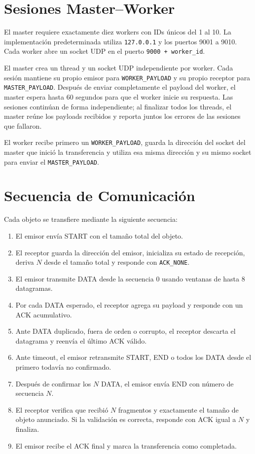 \documentclass[12pt]{article}
\begin{document}
\section{Sesiones Master--Worker}

El master requiere exactamente diez workers con IDs únicos del 1 al 10. La
implementación predeterminada utiliza \texttt{127.0.0.1} y los puertos 9001 a
9010. Cada worker abre un socket UDP en el puerto \texttt{9000 + worker\_id}.

El master crea un thread y un socket UDP independiente por worker. Cada sesión
mantiene su propio emisor para \texttt{WORKER\_PAYLOAD} y su propio receptor
para \texttt{MASTER\_PAYLOAD}. Después de enviar completamente el payload del
worker, el master espera hasta 60 segundos para que el worker inicie su
respuesta. Las sesiones continúan de forma independiente; al finalizar todos
los threads, el master reúne los payloads recibidos y reporta juntos los
errores de las sesiones que fallaron.

El worker recibe primero un \texttt{WORKER\_PAYLOAD}, guarda la dirección del
socket del master que inició la transferencia y utiliza esa misma dirección y
su mismo socket para enviar el \texttt{MASTER\_PAYLOAD}.

\section{Secuencia de Comunicación}

Cada objeto se transfiere mediante la siguiente secuencia:

\begin{enumerate}
\item El emisor envía START con el tamaño total del objeto.
\item El receptor guarda la dirección del emisor, inicializa su estado de recepción, deriva $N$ desde el tamaño total y responde con \texttt{ACK\_NONE}.
\item El emisor transmite DATA desde la secuencia 0 usando ventanas de hasta 8 datagramas.
\item Por cada DATA esperado, el receptor agrega su payload y responde con un ACK acumulativo.
\item Ante DATA duplicado, fuera de orden o corrupto, el receptor descarta el datagrama y reenvía el último ACK válido.
\item Ante timeout, el emisor retransmite START, END o todos los DATA desde el primero todavía no confirmado.
\item Después de confirmar los $N$ DATA, el emisor envía END con número de secuencia $N$.
\item El receptor verifica que recibió $N$ fragmentos y exactamente el tamaño de objeto anunciado. Si la validación es correcta, responde con ACK igual a $N$ y finaliza.
\item El emisor recibe el ACK final y marca la transferencia como completada.
\end{enumerate}
\end{document}
